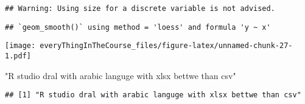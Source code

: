 \documentclass[
]{article}
\newenvironment{Shaded}{\begin{snugshade}}{\end{snugshade}}
\newcommand{\NormalTok}[1]{#1}
\newcommand{\SpecialCharTok}[1]{\textcolor[rgb]{0.00,0.00,0.00}{#1}}
\newcommand{\StringTok}[1]{\textcolor[rgb]{0.31,0.60,0.02}{#1}}
\begin{document}
\begin{verbatim}
## Warning: Using size for a discrete variable is not advised.
\end{verbatim}

\begin{verbatim}
## `geom_smooth()` using method = 'loess' and formula 'y ~ x'
\end{verbatim}

\texttt{[image: everyThingInTheCourse\_files/figure-latex/unnamed-chunk-27-1.pdf]}

\begin{Shaded}
\begin{Highlighting}[]
\StringTok{"R studio dral with arabic languge with xlsx bettwe than csv"}
\end{Highlighting}
\end{Shaded}

\begin{verbatim}
## [1] "R studio dral with arabic languge with xlsx bettwe than csv"
\end{verbatim}

\begin{Shaded}
\end{Shaded}
\end{document}
